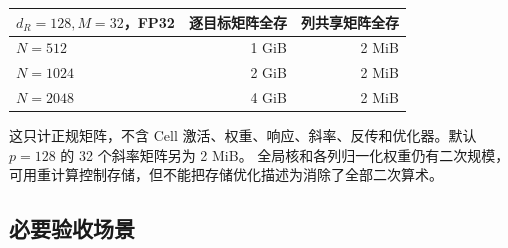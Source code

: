 \documentclass[11pt,UTF8,fontset=fandol]{ctexart}
\numberwithin{equation}{section}
\theoremstyle{definition}
\begin{document}
\begin{center}\small
\begin{tabular}{lrr}
\toprule
$d_R=128,M=32$，FP32 & 逐目标矩阵全存 & 列共享矩阵全存\\\midrule
$N=512$ & 1 GiB & 2 MiB\\
$N=1024$ & 2 GiB & 2 MiB\\
$N=2048$ & 4 GiB & 2 MiB\\\bottomrule
\end{tabular}
\end{center}
这只计正规矩阵，不含 Cell 激活、权重、响应、斜率、反传和优化器。默认 $p=128$ 的 32 个斜率矩阵另为 2 MiB。
全局核和各列归一化权重仍有二次规模，可用重计算控制存储，但不能把存储优化描述为消除了全部二次算术。

\subsection{必要验收场景}
\label{subsec:T:acceptance}
\end{document}

